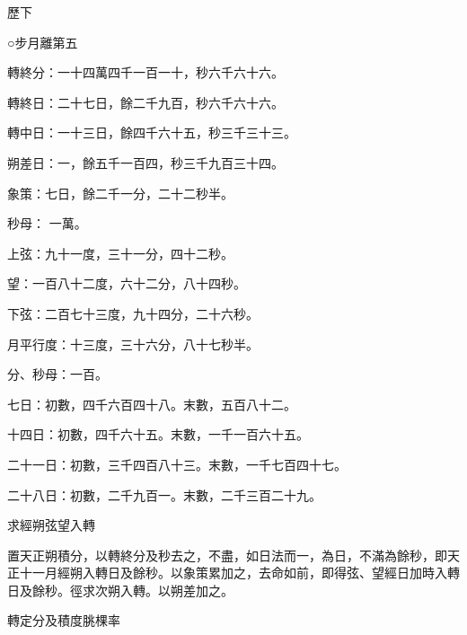 
\begin{pinyinscope}

 歷下



 ○步月離第五



 轉終分：一十四萬四千一百一十，秒六千六十六。



 轉終日：二十七日，餘二千九百，秒六千六十六。



 轉中日：一十三日，餘四千六十五，秒三千三十三。



 朔差日：一，餘五千一百四，秒三千九百三十四。



 象策：七日，餘二千一分，二十二秒半。



 秒母：
 一萬。



 上弦：九十一度，三十一分，四十二秒。



 望：一百八十二度，六十二分，八十四秒。



 下弦：二百七十三度，九十四分，二十六秒。



 月平行度：十三度，三十六分，八十七秒半。



 分、秒母：一百。



 七日：初數，四千六百四十八。末數，五百八十二。



 十四日：初數，四千六十五。末數，一千一百六十五。



 二十一日：初數，三千四百八十三。末數，一千七百四十七。



 二十八日：初數，二千九百一。末數，二千三百二十九。



 求經朔弦望入轉



 置天正朔積分，以轉終分及秒去之，不盡，如日法而一，為日，不滿為餘秒，即天正十一月經朔入轉日及餘秒。以象策累加之，去命如前，即得弦、望經日加時入轉日及餘秒。徑求次朔入轉。以朔差加之。



 轉定分及積度朓棵率




\end{pinyinscope}
